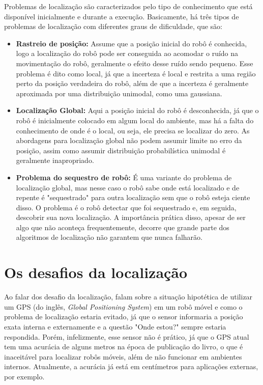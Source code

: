 \documentclass[acronym, symbols, table]{fei}
\begin{document}
			Problemas de localização são caracterizados pelo tipo de conhecimento que está disponível inicialmente e durante a execução. Basicamente, há três tipos de problemas de localização com diferentes graus de dificuldade, que são:
			
			\begin{itemize}
				\item \textbf{Rastreio de posição:} Assume que a posição inicial do robô é conhecida, logo a localização do robô pode ser conseguida ao acomodar o ruído na movimentação do robô, geralmente o efeito desse ruído sendo pequeno. Esse problema é dito como local, já que a incerteza é local e restrita a uma região perto da posição verdadeira do robô, além de que a incerteza é geralmente aproximada por uma distribuição unimodal, como uma gaussiana.
				
				\item \textbf{Localização Global:} Aqui a posição inicial do robô é desconhecida, já que o robô é inicialmente colocado em algum local do ambiente, mas há a falta do conhecimento de onde é o local, ou seja, ele precisa se localizar do zero. As abordagens para localização global não podem assumir limite no erro da posição, assim como assumir distribuição probabilística unimodal é geralmente inapropriado.
				
				\item \textbf{Problema do sequestro de robô:} É uma variante do problema de localização global, mas nesse caso o robô sabe onde está localizado e de repente é "sequestrado" para outra localização sem que o robô esteja ciente disso. O problema é o robô detectar que foi sequestrado e, em seguida, descobrir sua nova localização. A importância prática disso, apesar de ser algo que não aconteça frequentemente, decorre que grande parte dos algoritmos de localização não garantem que nunca falharão.
			\end{itemize}
			
		\section{Os desafios da localização}
		
			Ao falar dos desafio da localização, \textcite{siegwart2011introduction} falam sobre a situação hipotética de utilizar um GPS (do inglês, \textit{Global Positioning System}) em um robô móvel e como o problema de localização estaria evitado, já que o sensor informaria a posição exata interna e externamente e a questão "Onde estou?" sempre estaria respondida. Porém, infelizmente, esse sensor não é prático, já que o GPS atual tem uma acurácia de alguns metros na época de publicação do livro, o que é inaceitável para localizar robôs móveis, além de não funcionar em ambientes internos. Atualmente, a acurácia já está em centímetros para aplicações externas, por exemplo. 
			
\end{document}
